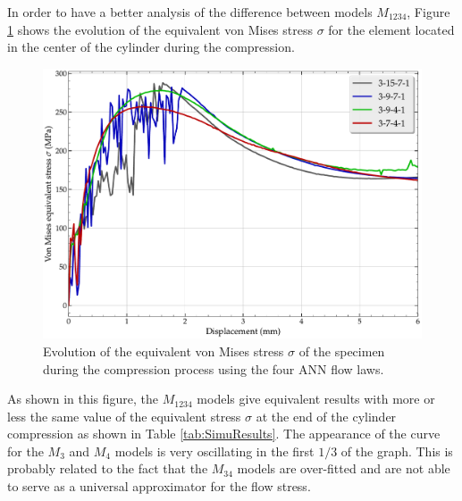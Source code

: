 \documentclass[algorithms,article,submit,pdftex,moreauthors]{Definitions/mdpi}
\begin{document}
In order to have a better analysis of the difference between models $M_{1234}$, Figure \ref{fig:misesCurve} shows the evolution of the equivalent von Mises stress $\sigma$ for the element located in the center of the cylinder during the compression.
\begin{figure}[!ht]
\centering
\includegraphics[width=0.75\columnwidth]{Figures/vonMisesCurve}
\caption{Evolution of the equivalent von Mises stress $\sigma$ of the specimen during the compression process using the four ANN flow laws.}
\label{fig:misesCurve}
\end{figure}
As shown in this figure, the $M_{1234}$ models give equivalent results with more or less the same value of the equivalent stress $\sigma$ at the end of the cylinder compression as shown in Table \ref{tab:SimuResults}.
The appearance of the curve for the $M_3$ and $M_4$ models is very oscillating in the first $1/3$ of the graph.
This is probably related to the fact that the $M_{34}$ models are over-fitted and are not able to serve as a universal approximator for the flow stress.
\end{document}
